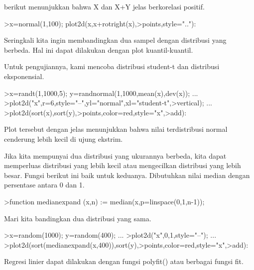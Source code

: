 \documentclass[a4paper,10pt]{article}
\begin{document}
\begin{eulernotebook}
\begin{eulercomment}
\begin{eulercomment}
\begin{eulercomment}
berikut menunjukkan bahwa X dan X+Y jelas berkorelasi positif.
\end{eulercomment}
\begin{eulerprompt}
>x=normal(1,100); plot2d(x,x+rotright(x),>points,style=".."):
\end{eulerprompt}
\begin{eulercomment}
Seringkali kita ingin membandingkan dua sampel dengan distribusi yang
berbeda. Hal ini dapat dilakukan dengan plot kuantil-kuantil.

Untuk pengujiannya, kami mencoba distribusi student-t dan distribusi
eksponensial.
\end{eulercomment}
\begin{eulerprompt}
>x=randt(1,1000,5); y=randnormal(1,1000,mean(x),dev(x)); ...
>plot2d("x",r=6,style="--",yl="normal",xl="student-t",>vertical); ...
>plot2d(sort(x),sort(y),>points,color=red,style="x",>add):
\end{eulerprompt}
\begin{eulercomment}
Plot tersebut dengan jelas menunjukkan bahwa nilai terdistribusi
normal cenderung lebih kecil di ujung ekstrim.

Jika kita mempunyai dua distribusi yang ukurannya berbeda, kita dapat
memperluas distribusi yang lebih kecil atau mengecilkan distribusi
yang lebih besar. Fungsi berikut ini baik untuk keduanya. Dibutuhkan
nilai median dengan persentase antara 0 dan 1.
\end{eulercomment}
\begin{eulerprompt}
>function medianexpand (x,n) := median(x,p=linspace(0,1,n-1));
\end{eulerprompt}
\begin{eulercomment}
Mari kita bandingkan dua distribusi yang sama.
\end{eulercomment}
\begin{eulerprompt}
>x=random(1000); y=random(400); ...
>plot2d("x",0,1,style="--"); ...
>plot2d(sort(medianexpand(x,400)),sort(y),>points,color=red,style="x",>add):
\end{eulerprompt}
\begin{eulercomment}
Regresi linier dapat dilakukan dengan fungsi polyfit() atau berbagai
fungsi fit.


\end{eulercomment}
\end{eulercomment}
\end{eulercomment}
\end{eulernotebook}
\end{document}
